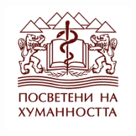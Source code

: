 
\vfill\vfill\vfill %


\hfill\hfill\hfill\hfill\hfill

	\includegraphics[width=0.35\textwidth]{logo.png}\\[1cm] %

\vfill %